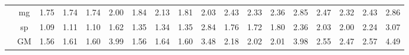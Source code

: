 \begin{table}[]
\begin{center}
{\begin{tabular}{|c|c|rrrr|rrrr|rrrr|rrrr|}
 &  mg  &  1.75  & \cellcolor{blue!25} 1.74  &  1.74  &   2.00  &  1.84  &  2.13  & \cellcolor{blue!25} 1.81  &   2.03  &  2.43  & \cellcolor{blue!25} 2.33  &  2.36  &  2.85  &  2.47  & \cellcolor{blue!25} 2.32  &  2.43  &   2.86 \\
 &  sp  &  1.09  &  1.11  & \cellcolor{blue!25} 1.10  &   1.62  &  1.35  & \cellcolor{blue!25} 1.34  &  1.35  &   2.84  &  1.76  & \cellcolor{blue!25} 1.72  &  1.80  &  2.36  &  2.03  & \cellcolor{blue!25} 2.00  &  2.24  &   3.07 \\
 &  GM  &  1.56  &  1.61  & \cellcolor{blue!25} 1.60  &   3.99  &  1.56  &  1.64  & \cellcolor{blue!25} 1.60  &   3.48  &  2.18  & \cellcolor{blue!25} 2.02  & \cellcolor{blue!25} 2.01  &  3.98  &  2.55  & \cellcolor{blue!25} 2.47  &  2.57  &   4.49 \\
\hline
\end{tabular} }

\end{center}
\end{table}
